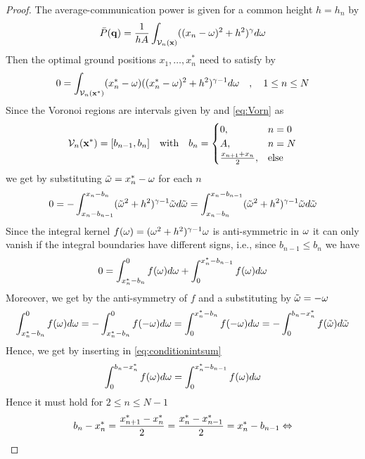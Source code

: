 \documentclass[smallabstract,smallcaptions]{dccpaper}
\newcommand{\Pbar}{\ensuremath{\bar{P}}}         %
\newcommand{\Vor}{\ensuremath{\mathcal{V}}}         %
\begin{document}
\begin{proof}
  The average-communication power is given for a common height $h=h_n$ by
  \begin{align}
    \Pbar(\vq)= \frac{1}{hA} \int_{\Vor_n(\vx)} ((x_n-\ome)^2+h^2)^{\gam}d\ome\label{eq:comonheightobj}
\end{align}
%
Then the optimal ground positions $x_1,\dots,x_n^*$ need to satisfy by 
%
\begin{align}
  0 = \int_{\Vor_n(\vx^*)} (x_n^*-\ome) ((x_n^*-\ome)^2+h^2)^{\gam-1}d\ome \quad,\quad 1\leq n\leq N\label{eq:vornx}
\end{align}
%
Since the Voronoi regions are intervals given by  and \eqref{eq:Vorn} as
%
\begin{align}
  \Vor_n(\vx^*) = [b_{n-1},b_n] \quad\text{with}\quad b_n= \begin{cases} 0, &n=0\\
    A, &n=N\\
    \frac{x_{n+1}+x_{n}}{2}, &\text{else}
  \end{cases}
\end{align}
%
we get by substituting ${  \tilde{\omega} }=x_n^*-\omega$ for each $n$ 
%
\begin{align}
  0=-\int_{x_n-b_{n-1}}^{x_n-b_{n}} ({  \tilde{\omega} }^2+h^2)^{\gamma-1}{  \tilde{\omega} } d{  \tilde{\omega} } 
  =\int_{x_n-b_{n}}^{x_n-b_{n-1}} ({  \tilde{\omega} }^2+h^2)^{\gamma-1}{  \tilde{\omega} } d{  \tilde{\omega} }
\end{align}
%
Since the integral kernel $f(\omega)=(\omega^2+h^2)^{\gamma-1}\omega$ is  anti-symmetric in $\omega$ it can only
vanish if the integral boundaries have different signs, i.e., since $b_{n-1}\leq b_n$ we have
%
\begin{align}
  0= \int_{x_n^*-b_{n}}^0 f(\omega)d\omega + \int_0^{x_n^*-b_{n-1}} f(\omega)d\omega \label{eq:conditionintsum}
\end{align}
%
Moreover, we get by the anti-symmetry of $f$ and a substituting by ${  \tilde{\omega} }=-\omega$
%
\begin{align}
  \int_{x_n^*-b_{n}}^0 f(\omega)d\omega =-\int_{x_n^*-b_{n}}^0f(-\omega)d\omega =\int_0^{x_n^*-b_{n}}f(-\omega)d\omega =
  -\int_{0}^{b_{n}-x_n^*} f({  \tilde{\omega} })d{  \tilde{\omega} } 
\end{align}
%
Hence, we get by inserting in \eqref{eq:conditionintsum}
%
\begin{align}
  \int_0^{b_n-x_n^*} f(\omega)d\omega = \int_0^{x_n^*-b_{n-1}}f(\omega)d\omega 
\end{align}
%
Hence it must hold  for $2\leq n\leq N-1$
%
\begin{align}
  b_{n} -x_n^*= \frac{x_{n+1}^* -x_n^*}{2}= \frac{x^*_n-x^*_{n-1}}{2} =x_n^*-b_{n-1} \LRA

\end{align}
\end{proof}
\end{document}
